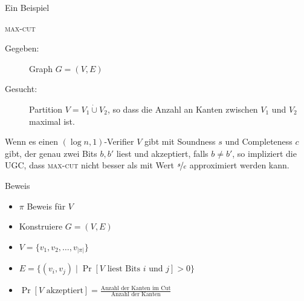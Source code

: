 \documentclass[table,german,10pt]{beamer}
\begin{document}
\begin{frame}{Ein Beispiel}
  \begin{block}{\textsc{max-cut}}
    \begin{description}
    \item[Gegeben:] Graph $G=(V,E)$
    \item[Gesucht:] Partition $V=V_{1}\dot{\cup} V_{2}$, so dass die
      Anzahl an Kanten zwischen $V_{1}$ und $V_{2}$ maximal ist.
    \end{description}
  \end{block}
\pause
\begin{theorem}
  Wenn es einen $(\log n,1)$-Verifier $V$ gibt mit Soundness $s$ und
  Completeness $c$ gibt, der genau zwei Bits $b,b'$ liest und
  akzeptiert, falls $b\neq b'$, so impliziert die UGC, dass
  \textsc{max-cut} nicht besser als mit Wert $\nicefrac{s}{c}$
  approximiert werden kann.
\end{theorem}
\pause
\begin{block}{Beweis}
  \begin{itemize}[<+->]
  \item $\pi$ Beweis für $V$
  \item Konstruiere $G=(V,E)$
  \item $V=\{v_{1},v_{2},\ldots,v_{|\pi|}\}$
  \item $E=\{(v_{i},v_{j})\mid \Pr[\text{$V$ liest Bits $i$ und $j$}]>0\}$
  \item $\Pr[\text{$V$ akzeptiert}]=\frac{\text{Anzahl der Kanten im
        Cut}}{\text{Anzahl der Kanten}}$

  \end{itemize}

  
\end{block}
\end{frame}
\end{document}
